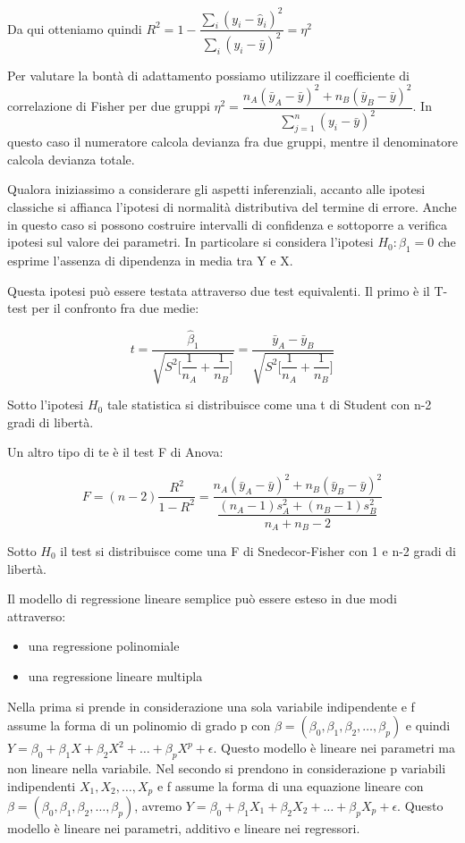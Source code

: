 \documentclass[a4paper]{extarticle}
\begin{document}
Da qui otteniamo quindi $R^2 = 1 - \dfrac{\sum\limits_i (y_i - \hat y_i)^2}{\sum\limits_i (y_i - \bar y)^2} = \eta^2$

Per valutare la bontà di adattamento possiamo utilizzare il coefficiente di correlazione di Fisher per due gruppi $\eta^2 = \dfrac{n_A ( \bar y_A - \bar y)^2 + n_B ( \bar y_B - \bar y)^2}{\sum\limits_{j=1}^n(y_i- \bar y)^2}$. In questo caso il numeratore calcola devianza fra due gruppi, mentre il denominatore calcola devianza totale.

Qualora iniziassimo a considerare gli aspetti inferenziali, accanto alle ipotesi classiche si affianca l'ipotesi di normalità distributiva del termine di errore. Anche in questo caso si possono costruire intervalli di confidenza e sottoporre a verifica ipotesi sul valore dei parametri. In particolare si considera l'ipotesi $H_0: \beta_1 =0$ che esprime l'assenza di dipendenza in media tra Y e X.

Questa ipotesi può essere testata attraverso due test equivalenti. Il primo è il T-test per il confronto fra due medie:

\begin{equation*}
t = \dfrac{\hat \beta_1}{\sqrt{S^2 \Biggr [  \dfrac{1}{n_A} + \dfrac{1}{n_B}  \Biggl ]}} =  \dfrac{\bar y_A - \bar y_B}{\sqrt{S^2 \Biggr [  \dfrac{1}{n_A} + \dfrac{1}{n_B}  \Biggl ]}} 
\end{equation*}

Sotto l'ipotesi $H_0$ tale statistica si distribuisce come una t di Student con n-2 gradi di libertà.

Un altro tipo di te è il test F di Anova:

\begin{equation*}
F = (n-2) \dfrac{R^2}{1-R^2} = \dfrac{n_A (\bar y_A - \bar y)^2 + n_B (\bar y_B - \bar y)^2}{\dfrac{(n_A - 1)s_A^2 + (n_B - 1)s_B^2}{n_A +n_B - 2}}
\end{equation*}

Sotto $H_0$ il test si distribuisce come una F di Snedecor-Fisher con 1 e n-2 gradi di libertà. 

Il modello di regressione lineare semplice può essere esteso in due modi attraverso:

\begin{itemize}
\item una regressione polinomiale 
\item una regressione lineare multipla
\end{itemize}

Nella prima si prende in considerazione una sola variabile indipendente e f assume la forma di un polinomio di grado p con $\beta = (\beta_0, \beta_1, \beta_2,\dots, \beta_p)$ e quindi $Y= \beta_0 + \beta_1 X + \beta_2 X^2 + \dots + \beta_p X^p + \epsilon$. Questo modello è lineare nei parametri ma non lineare nella variabile.  Nel secondo si prendono in considerazione p variabili indipendenti $X_1,X_2,\dots, X_p$ e f assume la forma di una equazione lineare con $\beta = (\beta_0, \beta_1,\beta_2,\dots, \beta_p)$, avremo $Y = \beta_0 + \beta_1X_1 + \beta_2 X_2+ \dots + \beta_p X_p + \epsilon$. Questo modello è lineare nei parametri, additivo e lineare nei regressori.
\end{document}
